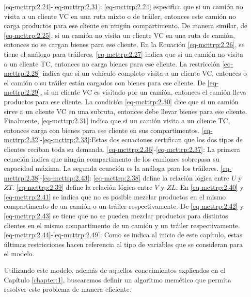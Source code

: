 \begin{itemize}
     \eqref{eq-mcttrp:2.24}-\eqref{eq-mcttrp:2.31}: \eqref{eq-mcttrp:2.24} especifica que si un camión no visita a un cliente VC en una ruta mixto o de tráiler, entonces este camión no carga productos para ese cliente en ningún compartimento. De manera similar, de \eqref{eq-mcttrp:2.25}, si un camión no visita un cliente VC en una ruta de camión, entonces no se cargan bienes para ese cliente. En la Ecuación \eqref{eq-mcttrp:2.26}, se tiene el análogo para tráileres. \eqref{eq-mcttrp:2.27} indica que si un camión no visita a un cliente TC, entonces no carga bienes para ese cliente. La restricción \eqref{eq-mcttrp:2.28} indica que si un vehículo completo visita a un cliente VC, entonces o el camión o su tráiler están cargados con bienes para ese cliente. De \eqref{eq-mcttrp:2.29}, si un cliente VC es visitado por un camión, entonces el camión lleva productos para ese cliente. La condición \eqref{eq-mcttrp:2.30} dice que si un camión sirve a un cliente VC en una subruta, entonces debe llevar bienes para ese cliente. Finalmente, \eqref{eq-mcttrp:2.31} indica que si un camión visita a un cliente TC, entonces carga con bienes para ese cliente en sus compartimentos.
     \eqref{eq-mcttrp:2.32}-\eqref{eq-mcttrp:2.33}:Estas dos ecuaciones certifican que los dos tipos de clientes reciban toda su demanda.
     \eqref{eq-mcttrp:2.36}-\eqref{eq-mcttrp:2.37}: La primera ecuación indica que ningún compartimento de los camiones sobrepasa su capacidad máxima. La segunda ecuación es la análoga para los tráileres.
     \eqref{eq-mcttrp:2.38}-\eqref{eq-mcttrp:2.43}: \eqref{eq-mcttrp:2.38} define la relación lógica entre $U$ y $ZT$. \eqref{eq-mcttrp:2.39} define la relación lógica entre $V$ y $ZL$. En \eqref{eq-mcttrp:2.40} y \eqref{eq-mcttrp:2.41} se indica que no es posible mezclar productos en el mismo compartimento de un camión o un tráiler respectivamente. De \eqref{eq-mcttrp:2.42} y \eqref{eq-mcttrp:2.43} se tiene que no se pueden mezclar productos para distintos clientes en el mismo compartimento de un camión y un tráiler respectivamente.
     \eqref{eq-mcttrp:2.44}-\eqref{eq-mcttrp:2.49}: Como se indica al inicio de este capítulo, estas últimas restricciones hacen referencia al tipo de variables que se consideran para el modelo. 
\end{itemize}

Utilizando este modelo, además de aquellos conocimientos explicados en el Capítulo \ref{chapter:1}, buscaremos definir un algoritmo memético que permita resolver este problema de manera eficiente.